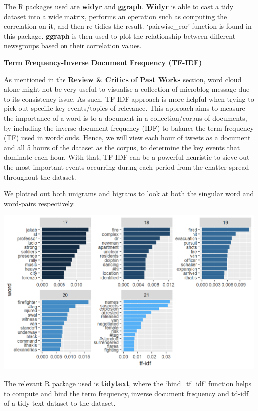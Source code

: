 \documentclass{acm_proc_article-sp}
\begin{document}
The R packages used are \textbf{widyr} and \textbf{ggraph}.
\textbf{Widyr} is able to cast a tidy dataset into a wide matrix,
performs an operation such as computing the correlation on it, and then
re-tidies the result. `pairwise\_cor' function is found in this package.
\textbf{ggraph} is then used to plot the relationship between different
newsgroups based on their correlation values.

\textbf{Term Frequency-Inverse Document Frequency (TF-IDF)}

As mentioned in the \textbf{Review \& Critics of Past Works} section,
word cloud alone might not be very useful to visualise a collection of
microblog message due to its consistency issue. As such, TF-IDF approach
is more helpful when trying to pick out specific key events/topics of
relevance. This approach aims to measure the importance of a word is to
a document in a collection/corpus of documents, by including the inverse
document frequency (IDF) to balance the term frequency (TF) used in
wordclouds. Hence, we will view each hour of tweets as a document and
all 5 hours of the dataset as the corpus, to determine the key events
that dominate each hour. With that, TF-IDF can be a powerful heuristic
to sieve out the most important events occurring during each period from
the chatter spread throughout the dataset.

We plotted out both unigrams and bigrams to look at both the singular
word and word-pairs respectively.

\includegraphics{img/image07.png}

The relevant R package used is \textbf{tidytext}, where the
`bind\_tf\_idf' function helps to compute and bind the term frequency,
inverse document frequency and td-idf of a tidy text dataset to the
dataset.
\end{document}
